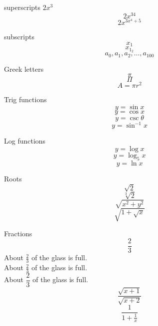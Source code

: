 \documentclass[12pt]{article}
\begin{document}
superscripts $2x^3$
$$2x^{34}$$
$$2x^{3x^4+5}$$

subscripts
$$x_1$$
$$x_{1_{2}}$$
$$a_0, a_1, a_2, \ldots, a_{100}$$

Greek letters
$$\pi$$
$$\Pi$$
$$A=\pi r^2$$

Trig functions
$$y=\sin x$$
$$y=\cos x$$
$$y=\csc \theta$$
$$y=\sin^{-1} x$$

Log functions
$$y=\log x$$
$$y=\log_5 x$$
$$y=\ln x$$

Roots
$$\sqrt{2}$$
$$\sqrt[3]{2}$$
$$\sqrt{x^2 + y^2}$$
$$\sqrt{ 1+\sqrt{x}}$$

Fractions
$$\frac{2}{3}$$
About $\displaystyle \frac{2}{3}$ of the glass is full. \\[6pt]
About  $\frac{2}{3}$ of the glass is full.\\[6pt]
About  $\dfrac{2}{3}$ of the glass is full.\\[6pt]
$$\frac{\sqrt{x+1}}{\sqrt{x+2}}$$
$$\frac{1}{1+\frac{1}{x}}$$
\end{document}
